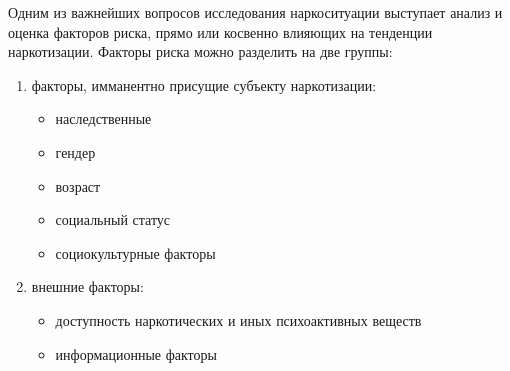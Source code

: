 Одним из важнейших вопросов исследования наркоситуации выступает анализ и
оценка факторов риска, прямо или косвенно влияющих на тенденции наркотизации. 
Факторы риска можно разделить на две группы:
\begin{enumerate}
    \item факторы, имманентно присущие субъекту наркотизации:
        \begin{itemize}
            \item наследственные
            \item гендер
            \item возраст
            \item социальный статус
            \item социокультурные факторы
        \end{itemize}
    \item внешние факторы:
        \begin{itemize}
            \item доступность наркотических и иных психоактивных веществ
            \item информационные факторы	
        \end{itemize}
\end{enumerate}	

